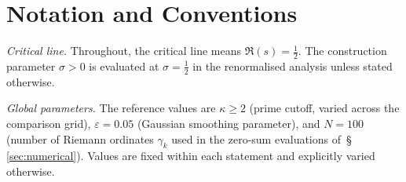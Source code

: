 \documentclass[11pt]{article}
\newcommand{\Hlocal}{H_{\mathrm{local}}}
\begin{document}
\begin{abstract}
\textbf{What remains open.}
Three questions separate the present construction from a full
prime-side derivation of Weil positivity for this family
(\S\,\ref{sec:open}).
Problem~\ref{op:weil} (\emph{Weil-normalised embedding})
asks whether the diagonal localisation of
Observation~\ref{obs:diagonal} can be implemented inside the
Lagarias--Weil functional, including the correct Gaussian
rescaling, the archimedean contribution, and the zero-side
contribution in its unconditional form.
Problem~\ref{op:spectral-ineq} (\emph{Spectral inequality})
asks whether, for every fixed cutoff~$\kappa$, there exists
$\varepsilon_0(\kappa)>0$ such that
$\mathcal{Z}_W(g^*_{1/2,\varepsilon})
\ge\Hlocal(\tfrac12,\kappa)$ holds unconditionally for all
$0<\varepsilon<\varepsilon_0(\kappa)$.
Problem~\ref{op:offdiag} (\emph{Off-diagonal control}) asks for
an unconditional bound on the cross-terms for the proxy family.

\textbf{Structure.}
The formal core in \S\S\,\ref{sec:construct}--\ref{sec:scale} is
non-circular: the analytic statements are labelled as proved,
the finite computations are labelled as numerical, and the
Weil-normalised embedding questions are isolated as open problems
in~\S\,\ref{sec:open}.
No use of the Riemann Hypothesis, the GUE conjecture, or the
Hilbert--P\'olya postulate is made anywhere in
\S\S\,\ref{sec:construct}--\ref{sec:scale}.
\end{abstract}

\vspace{2em}

\section*{Notation and Conventions}
\label{sec:notation}

\emph{Critical line.}
Throughout, the critical line means $\Re(s)=\tfrac12$.
The construction parameter $\sigma>0$ is evaluated at
$\sigma=\tfrac12$ in the renormalised analysis unless stated
otherwise.

\medskip
\emph{Global parameters.}
The reference values are $\kappa\ge 2$ (prime cutoff,
varied across the comparison grid),
$\varepsilon=0.05$ (Gaussian smoothing parameter), and
$N=100$ (number of Riemann ordinates $\gamma_k$ used in the
zero-sum evaluations of~\S\,\ref{sec:numerical}).
Values are fixed within each statement and explicitly varied
otherwise.
\end{document}

